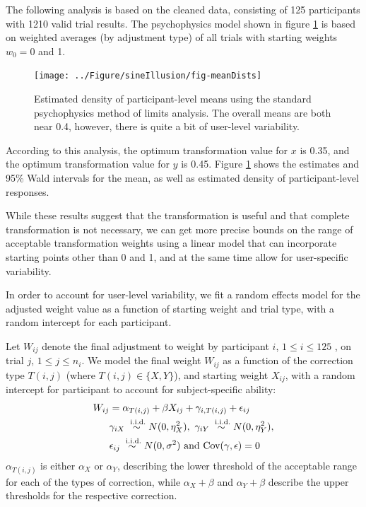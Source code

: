 \documentclass[11pt]{isuthesis}\usepackage[]{graphicx}\usepackage[]{color}
\newenvironment{knitrout}{}{} %
\begin{document}
The following analysis is based on the cleaned data, consisting of 125 participants with 1210 valid trial results. The psychophysics model shown in figure \ref{fig:psycho} is based on  weighted averages (by adjustment type) of all trials with starting weights $w_0 = 0$ and 1.


\begin{figure}\centering
\begin{knitrout}
\color{fgcolor}

{\centering \texttt{[image: ../Figure/sineIllusion/fig-meanDists]} 

}



\end{knitrout}
\caption[Results from psychophysics analysis]{Estimated density of participant-level means using the standard psychophysics method of limits analysis. The overall means are both near 0.4, however, there is quite a bit of user-level variability.\label{fig:psycho}}
\end{figure}



According to this analysis, the optimum transformation value for $x$ is 0.35, and the optimum transformation value for $y$ is 0.45. Figure \ref{fig:psycho} shows the estimates and 95\% Wald intervals for the mean, as well as estimated density of participant-level responses. 

While these results suggest that the transformation is useful and that complete transformation is not necessary, we can get more precise bounds on the range of acceptable transformation weights using a linear model that can incorporate starting points other than 0 and 1, and at the same time allow for user-specific variability.

In order to account for user-level variability, we fit a random effects model for the adjusted weight value as a function of  starting weight and trial type, with a random intercept for each participant. 

Let $W_{ij}$ denote the final adjustment to weight by participant $i$, $ 1 \le i \le 125$ , on trial $j$, $1 \le j \le n_i$. 
We model the final weight $W_{ij}$ as a function of the correction type $T(i,j)$  (where $T(i,j) \in  \{X, Y\}$), and starting weight $X_{ij}$, with a random intercept for participant to account for subject-specific ability: 
\begin{align}\label{model1}
W_{ij} &= \alpha_{T(i,j)} + \beta X_{ij} + \gamma_{i, T(i,j)} + \epsilon_{ij}\\
& \gamma_{iX} \stackrel{\text{ i.i.d.}}{\sim} N(0, \eta_X^2) , \ \gamma_{iY} \stackrel{\text{ i.i.d.}}{\sim} N(0, \eta_Y^2) ,\notag  \\
& \epsilon_{ij} \stackrel{\text{ i.i.d.}}{\sim} N(0, \sigma^2)  \text{ and } \text{Cov}(\gamma, \epsilon) = 0\notag 
\end{align}
 $\alpha_{T(i,j)}$ is either $\alpha_X$ or $\alpha_Y$, describing the lower threshold of the acceptable range for each of the types of correction, while $\alpha_X+\beta$ and $\alpha_Y + \beta$ describe the upper thresholds for the respective correction.
\end{document}
